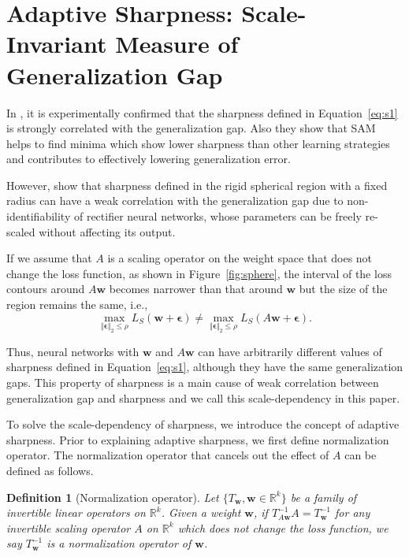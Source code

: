 \documentclass{article}
\newcommand{\mf}[1]{\mathbf{#1}}
\newtheorem{defi}{Definition}
\begin{document}
\section{Adaptive Sharpness: Scale-Invariant Measure of Generalization Gap} \label{sec:as}

In \citet{foret2021sharpnessaware}, it is experimentally confirmed that the sharpness defined in Equation~\ref{eq:s1} is strongly correlated with the generalization gap. Also they show that SAM helps to find minima which show lower sharpness than other learning strategies and contributes to effectively lowering generalization error.

However, \citet{dinh2017sharp} show that sharpness defined in the rigid spherical region with a fixed radius can have a weak correlation with the generalization gap due to non-identifiability of rectifier neural networks, whose parameters can be freely re-scaled without affecting its output. 

If we assume that $A$ is a scaling operator on the weight space that does not change the loss function, as shown in Figure~\ref{fig:sphere}, the interval of the loss contours around $A\mf{w}$ becomes narrower than that around $\mf{w}$ but the size of the region remains the same, i.e.,
\[\max_{\Vert \bm{\epsilon} \Vert_{2} \leq \rho} L_S(\mf{w}+\bm{\epsilon}) \neq \max_{\Vert \bm{\epsilon} \Vert_{2} \leq \rho} L_S( A\mf{w}+\bm{\epsilon}).\]

Thus, neural networks with $\mf{w}$ and $A\mf{w}$ can have arbitrarily different values of sharpness defined in Equation~\ref{eq:s1}, although they have the same generalization gaps. This property of sharpness is a main cause of weak correlation between generalization gap and sharpness and we call this scale-dependency in this paper.

To solve the scale-dependency of sharpness, we introduce the concept of adaptive sharpness. Prior to explaining adaptive sharpness, we first define normalization operator. The normalization operator that cancels out the effect of $A$ can be defined as follows.


\begin{defi}[Normalization operator]\label{norm_op}
	Let $\{T_\mf{w}, \mf{w}\in\mathbb{R}^k\}$ be a family of invertible linear operators on $\mathbb{R}^k$.
	Given a weight $\mf{w}$, if $T_{A\mf{w}}^{-1}A=T_\mf{w}^{-1}$ for any invertible scaling operator $A$ on $\mathbb{R}^k$ which does not change the loss function, we say $T_\mf{w}^{-1}$ is a normalization operator of $\mf{w}$.
\end{defi}
\end{document}
